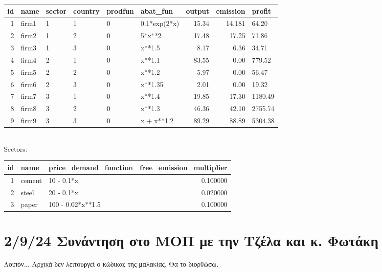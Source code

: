 \documentclass[a4paper,twoside,10pt]{article}
\begin{document}
\begin{tabular}{rlllllrrl}
	\toprule
	id & name & sector & country & prodfun & abat\_fun & output & emission & profit \\
	\midrule
	1 & firm1 & 1 & 1 & 0 & 0.1*exp(2*x) & 15.34 & 14.181 & 64.20\\
	2 & firm2 & 1 & 2 & 0 & 5*x**2 & 17.48 & 17.25 & 71.86\\
	3 & firm3 & 1 & 3 & 0 & x**1.5 & 8.17 & 6.36 & 34.71\\
	4 & firm4 & 2 & 1 & 0 & x**1.1 & 83.55 & 0.00 & 779.52\\
	5 & firm5 & 2 & 2 & 0 & x**1.2 & 5.97 & 0.00 & 56.47\\
	6 & firm6 & 2 & 3 & 0 & x**1.35 & 2.01 & 0.00 & 19.32\\
	7 & firm7 & 3 & 1 & 0 & x**1.4 & 19.85 & 17.30 & 1180.49\\
	8 & firm8 & 3 & 2 & 0 & x**1.3 & 46.36 & 42.10 & 2755.74\\
	9 & firm9 & 3 & 3 & 0 & x + x**1.2 & 89.29 & 88.89 & 5304.38\\
	\bottomrule
\end{tabular}\\
Sectors:
\begin{tabular}{rllr}
	\toprule
	  id & name & price\_demand\_function & free\_emission\_multiplier  \\
	\midrule
			1 & cement & 10 - 0.1*x & 0.100000 \\
			2 & steel & 20 - 0.1*x & 0.020000 \\
			3 & paper & 100 - 0.02*x**1.5 & 0.100000 \\
		\bottomrule
	\end{tabular}
	
\section{2/9/24 Συνάντηση στο ΜΟΠ με την Τζέλα και κ. Φωτάκη}
Λοιπόν... Αρχικά δεν λειτουργεί ο κώδικας της μαλακίας. Θα το διορθώσω. 
\end{document}
